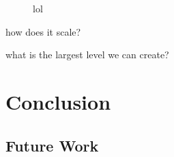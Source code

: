 \documentclass[runningheads]{llncs}
\begin{document}
\begin{figure}
\centering
\e\n
\w\w\w\w\w\w\w\e \w\w\w\w\w\e\e\e\e\e\e \w\w\w\w\w\e\e\w\w\w\w\w\n
\w\g\g\e\g\g\w\e \w\g\g\g\w\e\e\e\e\e\e \w\g\g\g\w\e\e\w\g\g\g\w\n
\w\e\e\g\e\e\w\e \w\g\e\g\w\e\e\e\e\e\e \w\g\e\g\w\e\e\w\g\e\g\w\n
\w\e\e\g\e\e\w\e \w\e\e\e\w\w\w\w\w\w\e \w\e\e\e\w\w\w\w\e\e\e\w\n
\w\g\g\e\g\g\w\e \w\g\e\e\e\e\e\e\g\w\e \w\g\e\e\e\e\e\e\e\e\g\w\n
\w\w\w\w\w\w\w\e \w\g\g\e\e\g\g\g\g\w\e \w\g\g\e\e\g\g\g\g\g\g\w\n
\e\e\e\e\e\e\e\e \w\w\w\w\w\w\w\w\w\w\e \w\w\w\w\w\w\w\w\w\w\w\w\n
\e\n
\w\w\w\w\w\e\e\w\w\w\w\w\e \e\e\e\w\w\w\w\e\w\w\w\w\e\e\e\n
\w\g\g\g\w\e\e\w\g\g\g\w\e \e\e\e\w\g\g\w\e\w\g\g\w\e\e\e\n
\w\e\e\e\w\w\w\w\e\e\e\w\e \w\w\w\w\e\e\w\w\w\e\e\w\w\w\w\n
\w\e\e\e\e\g\g\e\e\e\e\w\e \w\g\e\e\e\e\e\e\e\e\e\e\e\g\w\n
\w\e\e\e\w\w\w\w\e\e\e\w\e \w\g\e\e\e\e\e\e\e\e\e\e\e\g\w\n
\w\g\g\g\w\e\e\w\g\g\g\w\e \w\w\w\w\e\e\w\w\w\e\e\w\w\w\w\n
\w\w\w\w\w\e\e\w\w\w\w\w\e \e\e\e\w\g\g\w\e\w\g\g\w\e\e\e\n
\e\e\e\e\e\e\e\e\e\e\e\e\e \e\e\e\w\w\w\w\e\w\w\w\w\e\e\e\n
\e\n
\e\e\e\w\w\w\w\w\e\e\e\e \w\w\w\w\w\e\e\e\e \w\w\w\w\w\w\w\w\w\w\n
\e\e\e\w\g\g\g\w\e\e\e\e \w\g\g\g\w\e\e\e\e \w\g\g\g\e\e\e\g\g\w\n
\w\w\w\w\e\e\e\w\w\w\w\e \w\g\e\g\w\e\e\e\e \w\g\e\e\e\e\e\e\g\w\n
\w\g\e\e\e\w\e\e\e\g\w\e \w\e\w\e\w\w\w\w\e \w\w\w\w\e\e\w\w\w\w\n
\w\g\e\e\e\w\e\e\e\g\w\e \w\e\w\e\e\e\g\w\e \e\e\e\w\g\g\w\e\e\e\n
\w\w\w\w\e\e\e\w\w\w\w\e \w\g\g\e\e\g\g\w\e \w\w\w\w\e\e\w\w\w\w\n
\e\e\e\w\g\g\g\w\e\e\e\e \w\w\w\w\w\w\w\w\e \w\g\e\e\e\e\e\e\g\w\n
\e\e\e\w\w\w\w\w\e\e\e\e \e\e\e\e\e\e\e\e\e \w\g\g\g\e\e\e\g\g\w\n
\e\e\e\e\e\e\e\e\e\e\e\e \e\e\e\e\e\e\e\e\e \w\w\w\w\w\w\w\w\w\w\n
\e\n
\w\w\w\w\w\w\w\w\w\w\w\w\w\e \w\w\w\w\w\w\w\w\w\w\w\w\w\w\n
\w\g\g\g\e\g\g\g\e\e\g\g\w\e \w\g\g\g\e\e\g\g\e\e\g\g\g\w\n
\w\g\e\e\e\e\e\e\e\e\e\g\w\e \w\g\e\e\e\e\e\e\e\e\e\e\g\w\n
\w\w\w\w\e\w\w\w\e\w\w\w\w\e \w\w\w\w\e\e\w\w\e\e\w\w\w\w\n
\e\e\e\w\e\w\e\w\e\w\e\e\e\e \e\e\e\w\e\e\w\w\e\e\w\e\e\e\n
\w\w\w\w\e\w\w\w\e\w\w\w\w\e \w\w\w\w\e\e\w\w\e\e\w\w\w\w\n
\w\g\e\e\e\e\e\e\e\e\e\g\w\e \w\g\e\e\e\e\w\w\e\e\e\e\g\w\n
\w\g\g\g\e\g\g\g\e\e\g\g\w\e \w\g\g\g\g\g\w\w\g\g\g\g\g\w\n
\w\w\w\w\w\w\w\w\w\w\w\w\w\e \w\w\w\w\w\w\w\w\w\w\w\w\w\w\n
\caption{lol}
\end{figure}
how does it scale?

what is the largest level we can create?

\section{Conclusion}
\subsection{Future Work}

%
%
%


%
\end{document}
